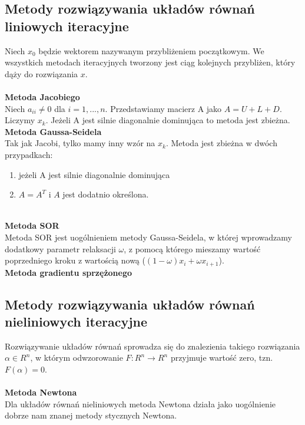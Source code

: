 \documentclass[12pt]{article}
\begin{document}
\subsection{Metody rozwiązywania układów równań liniowych iteracyjne}
Niech $x_{0}$ będzie wektorem nazywanym przybliżeniem początkowym. We wszystkich metodach iteracyjnych tworzony jest ciąg kolejnych przybliżen, który dąży do rozwiązania $x$.\\
~\\
\textbf{Metoda Jacobiego}\\
Niech $a_{ii} \neq 0$ dla $i = 1,...,n$. Przedstawiamy macierz A jako $A = U + L + D$. Liczymy $x_{k}$. Jeżeli A jest silnie diagonalnie dominująca to metoda jest zbieżna.
~\\
\textbf{Metoda Gaussa-Seidela}\\
Tak jak Jacobi, tylko mamy inny wzór na $x_{k}$. Metoda jest zbieżna w dwóch przypadkach:
\begin{enumerate}
	\item jeżeli A jest silnie diagonalnie dominująca
	\item $A = A^{T}$ i $A$ jest dodatnio określona.
\end{enumerate}
~\\
\textbf{Metoda SOR}\\
Metoda SOR jest uogólnieniem metody Gaussa-Seidela, w której wprowadzamy dodatkowy parametr relaksacji $\omega$, z pomocą którego mieszamy wartość poprzedniego kroku z wartością nową ($(1-\omega)x_{i} + \omega x_{i+1}$).
~\\
\textbf{Metoda gradientu sprzężonego}

\subsection{Metody rozwiązywania układów równań nieliniowych iteracyjne}
Rozwiązywanie układów równań sprowadza się do znalezienia takiego rozwiązania $\alpha \in R^{n}$, w którym odwzorowanie $F: R^{n} \rightarrow R^{n}$ przyjmuje wartość zero, tzn. $F(\alpha) = 0$.\\
~\\
\textbf{Metoda Newtona}\\
Dla układów równań nieliniowych metoda Newtona działa jako uogólnienie dobrze nam znanej metody stycznych Newtona. 
\end{document}
